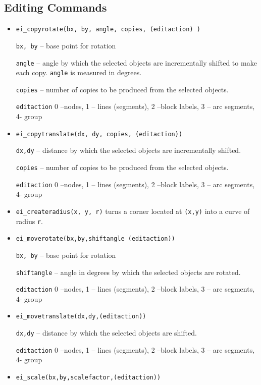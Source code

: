 \subsection{Editing Commands}
\begin{itemize}

\item \texttt{ei\_copyrotate(bx, by, angle, copies, (editaction) )}

\texttt{bx, by} -- base point for rotation

\texttt{angle} -- angle by which the selected objects are incrementally
shifted to make each copy. \texttt{angle} is measured in degrees.

\texttt{copies} -- number of copies to be produced from the selected
objects.

\texttt{editaction} 0 --nodes, 1 -- lines (segments), 2 --block labels, 3 --
arc segments, 4- group

\item \texttt{ei\_copytranslate(dx, dy, copies, (editaction))}

\texttt{dx,dy} -- distance by which the selected objects are incrementally
shifted.

\texttt{copies} -- number of copies to be produced from the selected
objects.

\texttt{editaction} 0 --nodes, 1 -- lines (segments), 2 --block labels, 3 --
arc segments, 4- group

\item{\tt ei\_createradius(x, y, r)} turns a corner located at {\tt (x,y)} into a curve of radius {\tt r}.

\item \texttt{ei\_moverotate(bx,by,shiftangle (editaction))}

\texttt{bx, by} -- base point for rotation

\texttt{shiftangle} -- angle in degrees by which the selected objects are
rotated.

\texttt{editaction} 0 --nodes, 1 -- lines (segments), 2 --block labels, 3 --
arc segments, 4- group

\item \texttt{ei\_movetranslate(dx,dy,(editaction))}

\texttt{dx,dy} -- distance by which the selected objects are shifted.

\texttt{editaction} 0 --nodes, 1 -- lines (segments), 2 --block labels, 3 --
arc segments, 4- group

\item \texttt{ei\_scale(bx,by,scalefactor,(editaction))}


\end{itemize}
